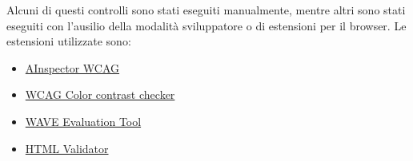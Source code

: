 Alcuni di questi controlli sono stati eseguiti manualmente, mentre altri sono stati eseguiti con l'ausilio della modalità sviluppatore o di estensioni per il browser.
Le estensioni utilizzate sono: \begin{itemize}
    \item \href{https://addons.mozilla.org/en-US/firefox/addon/ainspector-wcag/}{AInspector WCAG}
    \item \href{https://addons.mozilla.org/en-US/firefox/addon/wcag-contrast-checker/}{WCAG Color contrast checker}
    \item \href{https://chrome.google.com/webstore/detail/wave-evaluation-tool/jbbplnpkjmmeebjpijfedlgcdilocofh}{WAVE Evaluation Tool}
    \item \href{https://chrome.google.com/webstore/detail/html-validator/mpbelhhnfhfjnaehkcnnaknldmnocglk}{HTML Validator}
\end{itemize}